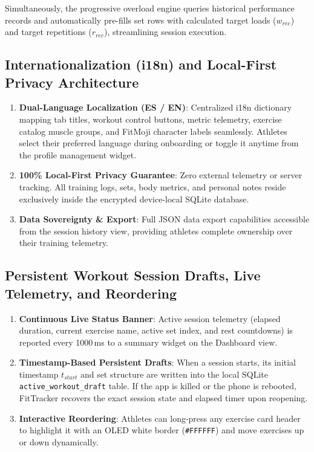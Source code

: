 Simultaneously, the progressive overload engine queries historical performance records and automatically pre-fills set rows with calculated target loads ($w_{rec}$) and target repetitions ($r_{rec}$), streamlining session execution.

\subsection{Internationalization (i18n) and Local-First Privacy Architecture}
\begin{enumerate}
    \item \textbf{Dual-Language Localization (ES / EN)}: Centralized i18n dictionary mapping tab titles, workout control buttons, metric telemetry, exercise catalog muscle groups, and FitMoji character labels seamlessly. Athletes select their preferred language during onboarding or toggle it anytime from the profile management widget.
    \item \textbf{100\% Local-First Privacy Guarantee}: Zero external telemetry or server tracking. All training logs, sets, body metrics, and personal notes reside exclusively inside the encrypted device-local SQLite database.
    \item \textbf{Data Sovereignty \& Export}: Full JSON data export capabilities accessible from the session history view, providing athletes complete ownership over their training telemetry.
\end{enumerate}

\subsection{Persistent Workout Session Drafts, Live Telemetry, and Reordering}
\begin{enumerate}
    \item \textbf{Continuous Live Status Banner}: Active session telemetry (elapsed duration, current exercise name, active set index, and rest countdowns) is reported every 1000\,ms to a summary widget on the Dashboard view.
    \item \textbf{Timestamp-Based Persistent Drafts}: When a session starts, its initial timestamp $t_{start}$ and set structure are written into the local SQLite \texttt{active\_workout\_draft} table. If the app is killed or the phone is rebooted, FitTracker recovers the exact session state and elapsed timer upon reopening.
    \item \textbf{Interactive Reordering}: Athletes can long-press any exercise card header to highlight it with an OLED white border (\texttt{\#FFFFFF}) and move exercises up or down dynamically.
\end{enumerate}

